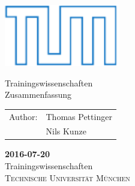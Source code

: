 \documentclass{article}
\begin{document}
\setcounter{tocdepth}{2} %


\begin{titlepage}
  \centering\includegraphics[width=5cm]{pictures/tumlogo}

  \vspace{2.5cm}
  \Huge{Trainingswissenschaften} \\
  \vspace{0.1in}\huge{Zusammenfassung}\\

  \Large
  \vspace{1.5cm}
  \begin{tabularx}{9cm}{r l}
    Author: & Thomas Pettinger\\
            & Nils Kunze\\
  \end{tabularx}

  \vfill
  \textbf{2016-07-20} \\
  \vspace{0.3in}\normalsize{Trainingswissenschaften}\\
  \vspace{0.03in}\normalsize{\textsc{Technische Universität München}}\\
  \vspace{1cm}

\end{titlepage}


\newpage
\thispagestyle{empty}
\tableofcontents

\newpage
{}


\newpage

\newpage

\newpage

\newpage

\newpage

\newpage


\newpage


\end{document}
